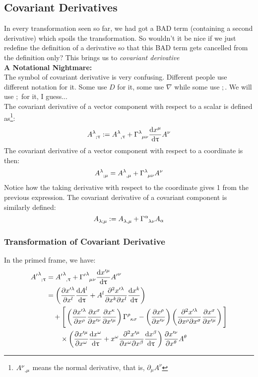 \subsection{Covariant Derivatives}
In every transformation seen so far, we had got a BAD term (containing a second derivative) which spoils the transformation. So wouldn't it be nice if we just redefine the definition of a derivative so that this BAD term gets cancelled from the definition only? This brings us to \textit{covariant derivative} 
\\[0.3cm]
\textbf{A Notational Nightmare:}\\[0.3cm]
The symbol of covariant derivative is very confusing. Different people use different notation for it. Some use $D$ for it, some use $\nabla$ while some use $;$. We will use $;$ for it, I guess...\\[0.3cm]
The covariant derivative of a vector component with respect to a scalar is defined as\footnote{$\tensor{A}{^\nu _, _\mu}$ means the normal derivative, that is, $\partial_\mu A^\nu$}:
$$\tensor{A}{^\lambda _; _\uptau} := \tensor{A}{^\lambda _, _\uptau}+ \tensor{\Gamma}{^\lambda _\mu _\nu}\dv{x^\mu}{\uptau}A^\nu$$
The covariant derivative of a vector component with respect to a coordinate is then: 
$$\tensor{A}{^\lambda _; _\mu} =  \tensor{A}{^\lambda _, _\mu} +\tensor{\Gamma}{^\lambda _\mu _\nu}A^\nu$$
Notice how the taking derivative with respect to the coordinate gives 1 from the previous expression. The covariant derivative of a covariant component is similarly defined:
$$\tensor{A}{_\lambda _; _\mu} :=  \tensor{A}{_\lambda _, _\mu} +\tensor{\Gamma}{^\alpha _\lambda _\nu}A_\alpha$$
\subsubsection{Transformation of Covariant Derivative}
In the primed frame, we have: 
\begin{align*}
\tensor{{A'}}{^\lambda _{;\uptau}} &= \tensor{{A'}}{^\lambda _{,\uptau}} + \tensor{{\Gamma'}}{^\lambda _{\mu \nu}} \dv{x'^\mu}{\uptau} \tensor{{A'}}{^\nu} \\
&= \left( \pdv{x'^\lambda}{x^l} \dv{A^l}{\uptau} 
+ A^l \pdv{x'^\lambda}{x^k}{x^l} \dv{x^k}{\uptau} \right) \\
&\quad + \Bigg[ 
\brac{\pdv{x'^\lambda}{x^\rho}\pdv{{x^\sigma}}{{x'^\nu}} \pdv{{x^\kappa}}{{x'^\mu}}}  \tensor{\Gamma}{^\rho _\kappa _\sigma} - \brac{\pdv{{x^\rho}}{{x'^\nu}}}\brac{\pdv{x'^\lambda}{x^\rho}{x^\sigma}\pdv{{x^\sigma}}{{x'^\mu}}}  \Bigg]
 \\
&\qquad \times \left( 
\pdv{x'^\mu}{x^\omega} \dv{x^\omega}{\uptau} 
+ x^\omega \pdv[2]{x'^\mu}{x^\omega}{x^\beta} \dv{x^\beta}{\uptau} 
\right)
\pdv{{x'^\nu}}{{x^\theta}} A^\theta
\end{align*}

